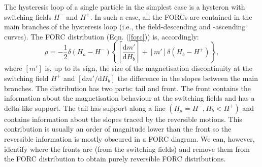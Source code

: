 The hysteresis loop of a single particle in the simplest case is a hysteron with switching fields $H^{-}$ and $H^{+}$. In such a case, all the FORCs are contained in the main branches of the hysteresis loop (i.e., the field-descending and -ascending curves). The FORC distribution (Eqn. (\ref{forc})) is, accordingly:
\begin{equation}\label{forc hysteron}
\rho = -\frac{1}{2} \delta \left( H_a - H^{-} \right) \left\{ \left[ \frac{\text{d} m' }{\text{d}H_b} \right] + \left[ m' \right] \delta(H_b - H^{+}) \right\},
\end{equation}
where $\left[ m' \right]$ is, up to its sign, the size of the magnetisation discontinuity at the switching field $H^{+}$ and $\left[ \text{d} m' / \text{d}H_b \right]$ the difference in the slopes between the main branches. The distribution has two parts: tail and front. The front contains the information about the magnetisation behaviour at the switching fields and has a delta-like support. The tail has support along a line $(H_a=H^{-}, H_b<H^{+})$ and contains information about the slopes traced by the reversible motions. This contribution is usually an order of magnitude lower than the front so the reversible information is mostly obscured in a FORC diagram. We can, however, identify where the fronts are (from the switching fields) and remove them from the FORC distribution to obtain purely reversible FORC distributions.\par

